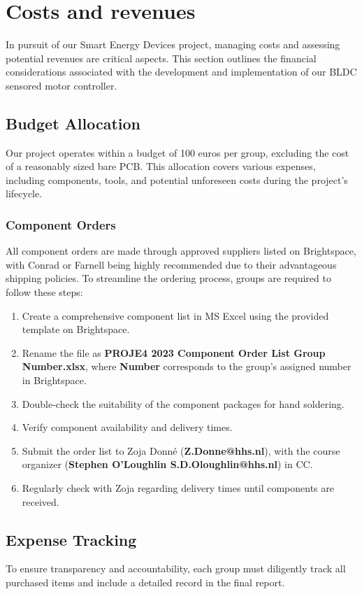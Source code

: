 \section{Costs and revenues}
In pursuit of our Smart Energy Devices project, managing costs and assessing potential revenues are critical aspects. This section outlines the financial considerations associated with the development and implementation of our BLDC sensored motor controller.

\subsection{Budget Allocation}
Our project operates within a budget of 100 euros per group, excluding the cost of a reasonably sized bare PCB. This allocation covers various expenses, including components, tools, and potential unforeseen costs during the project's lifecycle.

\subsubsection{Component Orders}
All component orders are made through approved suppliers listed on Brightspace, with Conrad or Farnell being highly recommended due to their advantageous shipping policies. To streamline the ordering process, groups are required to follow these steps:

\begin{enumerate}
    \item Create a comprehensive component list in MS Excel using the provided template on Brightspace.
    \item Rename the file as \textbf{PROJE4 2023 Component Order List Group Number.xlsx}, where \textbf{Number} corresponds to the group's assigned number in Brightspace.
    \item Double-check the suitability of the component packages for hand soldering.
    \item Verify component availability and delivery times.
    \item Submit the order list to Zoja Donné (\textbf{Z.Donne@hhs.nl}), with the course organizer (\textbf{Stephen O’Loughlin S.D.Oloughlin@hhs.nl}) in CC.
    \item Regularly check with Zoja regarding delivery times until components are received.
\end{enumerate}

\subsection{Expense Tracking}
To ensure transparency and accountability, each group must diligently track all purchased items and include a detailed record in the final report.

